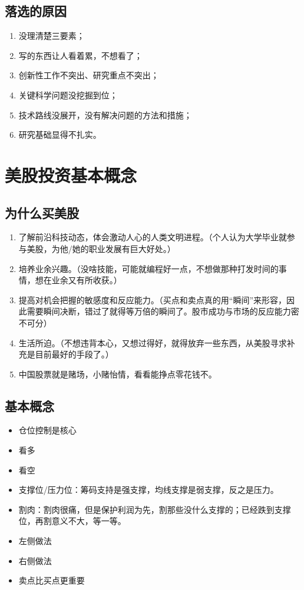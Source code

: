 \section{落选的原因}
\begin{enumerate}
\item 没理清楚三要素；
\item 写的东西让人看着累，不想看了；
\item 创新性工作不突出、研究重点不突出；
\item 关键科学问题没挖掘到位；
\item 技术路线没展开，没有解决问题的方法和措施；
\item 研究基础显得不扎实。
\end{enumerate}



\chapter{美股投资基本概念}
\section{为什么买美股}
\begin{enumerate}
\item 了解前沿科技动态，体会激动人心的人类文明进程。（个人认为大学毕业就参与美股，为他/她的职业发展有巨大好处。）

\item 培养业余兴趣。（没啥技能，可能就编程好一点，不想做那种打发时间的事情，想在业余又有所收获。）

\item 提高对机会把握的敏感度和反应能力。（买点和卖点真的用“瞬间”来形容，因此需要瞬间决断，错过了就得等万倍的瞬间了。股市成功与市场的反应能力密不可分）

\item 生活所迫。（不想违背本心，又想过得好，就得放弃一些东西，从美股寻求补充是目前最好的手段了。）

\item 中国股票就是赌场，小赌怡情，看看能挣点零花钱不。
\end{enumerate}



\section{基本概念}
\begin{itemize}
\item 仓位控制是核心
\item 看多
\item 看空
\item 支撑位/压力位：筹码支持是强支撑，均线支撑是弱支撑，反之是压力。
\item 割肉：割肉很痛，但是保护利润为先，割那些没什么支撑的；已经跌到支撑位，再割意义不大，等一等。
\item 左侧做法
\item 右侧做法
\item 卖点比买点更重要
\end{itemize}








